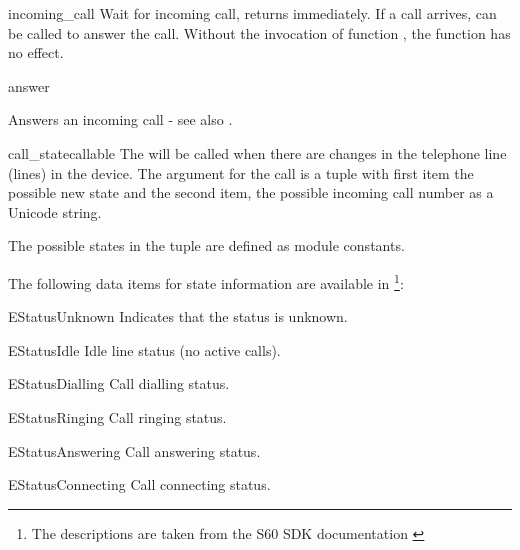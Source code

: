 \begin{funcdesc}{incoming_call}{}
Wait for incoming call, returns immediately. If a call arrives,  
can be called to answer the call. Without the invocation of function 
, the function  has no effect.
\end{funcdesc}

\begin{funcdesc}{answer}{}

Answers an incoming call - see also . 

\end{funcdesc}

\begin{funcdesc}{call_state}{callable}
The  will be called when there are changes in the telephone line 
(lines) in the device. The argument for the call is a tuple with first item the 
possible new state and the second item, the possible incoming call number as a 
Unicode string.

The possible states in the tuple are defined as  module 
constants.
\end{funcdesc}

The following data items for state information are available in 
\footnote{The descriptions are taken from the S60 SDK 
documentation \cite{S60Doc}}:

\begin{datadesc}{EStatusUnknown}
Indicates that the status is unknown.
\end{datadesc}

\begin{datadesc}{EStatusIdle}
Idle line status (no active calls).
\end{datadesc}

\begin{datadesc}{EStatusDialling}
Call dialling status.
\end{datadesc}

\begin{datadesc}{EStatusRinging}
Call ringing status.
\end{datadesc}

\begin{datadesc}{EStatusAnswering}
Call answering status.
\end{datadesc}

\begin{datadesc}{EStatusConnecting}
Call connecting status.
\end{datadesc}

